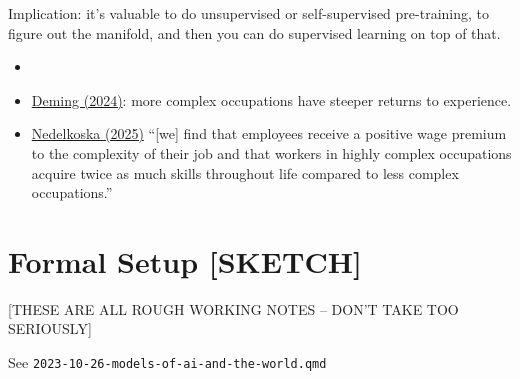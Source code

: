 \documentclass[
  10pt,
  letterpaper,
  DIV=11,
  numbers=noendperiod,
  oneside]{scrartcl}
\providecommand{\tightlist}{%
  \setlength{\itemsep}{0pt}\setlength{\parskip}{0pt}}\usepackage{longtable,booktabs,array}
\begin{document}
Implication: it's valuable to do unsupervised or self-supervised
pre-training, to figure out the manifold, and then you can do supervised
learning on top of that.

\begin{description}
\tightlist
\item[Economics literature on returns to experience.]
\begin{itemize}
\tightlist
\item[]
\item
  \href{https://cowles.yale.edu/sites/default/files/2023-06/Deming_OJL_June2023.pdf}{Deming
  (2024)}: more complex occupations have steeper returns to experience.
\item
  \href{https://www.innovationgrowth.com/fileadmin/innovationgrowth/publications/96021_Learning_by_Problem_Solving_2015_Peer_Ederer.pdf}{Nedelkoska
  (2025)} ``{[}we{]} find that employees receive a positive wage premium
  to the complexity of their job and that workers in highly complex
  occupations acquire twice as much skills throughout life compared to
  less complex occupations.''
\end{itemize}
\end{description}

\section{Formal Setup {[}SKETCH{]}}\label{formal-setup-sketch}

{[}THESE ARE ALL ROUGH WORKING NOTES -- DON'T TAKE TOO SERIOUSLY{]}

See \texttt{2023-10-26-models-of-ai-and-the-world.qmd}

\marginnote{\begin{footnotesize}

\[
   \xymatrix@R=1em@C=2em{
      \txt{state} & \txt{signal} & \txt{representation} \\
               & \boxed{x_{1}}\ar[dddr]\ar[dr] \\
      v_1\ar@{-}[ur]\ar@{-}[r]\ar@{-}[dddr]\ar@{-}[ddr]
               & \boxed{x_{2}}\ar[ddr]\ar[r]
                           & \hat{v}_1\\
      {\tiny\vdots} & {\tiny\vdots} & {\tiny\vdots} \\
      v_q\ar@{-}[uuur]\ar@{-}[uur]\ar@{-}[r]\ar@{-}[dr]
               & \boxed{x_{p-1}}\ar[r]\ar[uur]
                           & \hat{v}_q\\
               & \boxed{x_{p}}\ar[ur]\ar[uuur]}
\]

\end{footnotesize}}
\end{document}
